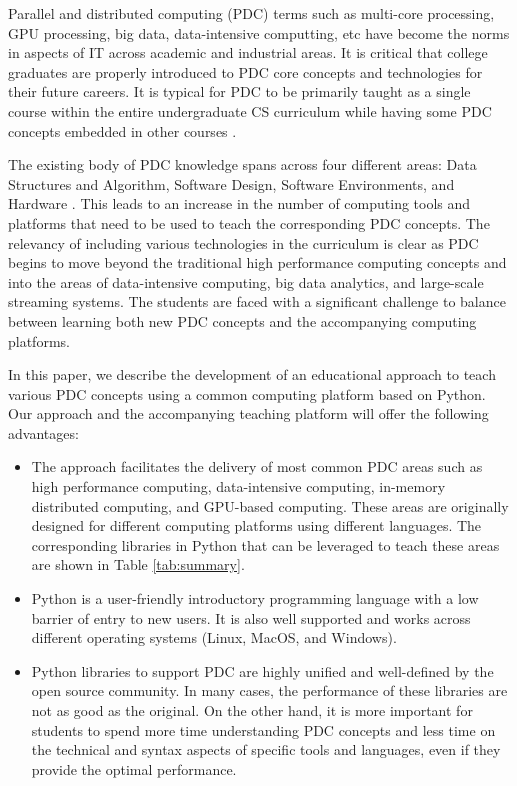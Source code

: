 Parallel and distributed computing (PDC) terms such as multi-core processing,
GPU processing, big data, data-intensive computting, etc have become the norms
in aspects of IT across academic and industrial areas. It is critical that
college graduates are properly introduced to PDC core concepts and
technologies for their future careers. It is typical for PDC to be primarily
taught as a single course within the entire undergraduate CS curriculum while
having some PDC concepts embedded in other courses
\cite{wolffe2009teaching,butler1988introducing}.

The existing body of PDC knowledge spans across four different areas: Data
Structures and Algorithm, Software Design, Software Environments, and Hardware
\cite{brown2010strategies}. This leads to an increase in the number of
computing tools and platforms that need to be used to teach the corresponding
PDC concepts. The relevancy of including various technologies in the curriculum
is clear as PDC begins to move beyond the traditional high performance computing
concepts and into the areas of data-intensive computing, big data analytics, and
 large-scale streaming systems. The students are faced with a significant
 challenge to balance between learning both new PDC concepts and the
accompanying computing platforms.

In this paper, we describe the development of an educational approach to teach
various PDC concepts using a common computing platform based on Python. Our
approach and the accompanying teaching platform will offer the following
advantages:

\begin{itemize}
  \item The approach facilitates the delivery of most common PDC areas such as
   high performance computing, data-intensive computing, in-memory distributed
    computing, and GPU-based computing. These areas are originally designed for
    different computing platforms using different languages. The corresponding
    libraries in Python that can be leveraged to teach these areas are shown in
    Table \ref{tab:summary}.
  \item Python is a user-friendly introductory programming language with a low
    barrier of entry to new users. It is also well supported and works across
    different operating systems (Linux, MacOS, and Windows).
  \item Python libraries to support PDC are highly unified and well-defined by
    the open source community. In many cases, the performance of these libraries
    are not as good as the original. On the other hand, it is more important for
    students to spend more time understanding PDC concepts and less time on the
    technical and syntax aspects of specific tools and languages, even if they provide the optimal performance.
\end{itemize}

